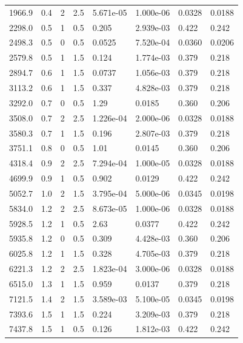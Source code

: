 \documentclass[preview]{standalone}
\begin{document}
{{\begin{tabular}{L{1.2cm}C{1.2cm} C{0.3cm}C{0.5cm} C{1.4cm}C{1.4cm} C{1.4cm}C{1.4cm}}
  1966.9  &   0.4  & 2     & 2.5 &  5.671e-05  & 1.000e-06  & 0.0328 &  0.0188   \\ 
  2298.0  &   0.5  & 1     & 0.5 &  0.205  & 2.939e-03  & 0.422 &  0.242   \\ 
  2498.3  &   0.5  & 0     & 0.5 &  0.0525  & 7.520e-04  & 0.0360 &  0.0206   \\ 
  2579.8  &   0.5  & 1     & 1.5 &  0.124  & 1.774e-03  & 0.379 &  0.218   \\ 
  2894.7  &   0.6  & 1     & 1.5 &  0.0737  & 1.056e-03  & 0.379 &  0.218   \\ 
  3113.2  &   0.6  & 1     & 1.5 &  0.337  & 4.828e-03  & 0.379 &  0.218   \\ 
  3292.0  &   0.7  & 0     & 0.5 &  1.29  & 0.0185  & 0.360 &  0.206   \\ 
  3508.0  &   0.7  & 2     & 2.5 &  1.226e-04  & 2.000e-06  & 0.0328 &  0.0188   \\ 
  3580.3  &   0.7  & 1     & 1.5 &  0.196  & 2.807e-03  & 0.379 &  0.218   \\ 
  3751.1  &   0.8  & 0     & 0.5 &  1.01  & 0.0145  & 0.360 &  0.206   \\ 
  4318.4  &   0.9  & 2     & 2.5 &  7.294e-04  & 1.000e-05  & 0.0328 &  0.0188   \\ 
  4699.9  &   0.9  & 1     & 0.5 &  0.902  & 0.0129  & 0.422 &  0.242   \\ 
  5052.7  &   1.0  & 2     & 1.5 &  3.795e-04  & 5.000e-06  & 0.0345 &  0.0198   \\ 
  5834.0  &   1.2  & 2     & 2.5 &  8.673e-05  & 1.000e-06  & 0.0328 &  0.0188   \\ 
  5928.5  &   1.2  & 1     & 0.5 &  2.63  & 0.0377  & 0.422 &  0.242   \\ 
  5935.8  &   1.2  & 0     & 0.5 &  0.309  & 4.428e-03  & 0.360 &  0.206   \\ 
  6025.8  &   1.2  & 1     & 1.5 &  0.328  & 4.705e-03  & 0.379 &  0.218   \\ 
  6221.3  &   1.2  & 2     & 2.5 &  1.823e-04  & 3.000e-06  & 0.0328 &  0.0188   \\ 
  6515.0  &   1.3  & 1     & 1.5 &  0.959  & 0.0137  & 0.379 &  0.218   \\ 
  7121.5  &   1.4  & 2     & 1.5 &  3.589e-03  & 5.100e-05  & 0.0345 &  0.0198   \\ 
  7393.6  &   1.5  & 1     & 1.5 &  0.224  & 3.209e-03  & 0.379 &  0.218   \\ 
  7437.8  &   1.5  & 1     & 0.5 &  0.126  & 1.812e-03  & 0.422 &  0.242   \\ 

\end{tabular}}}
\end{document}
